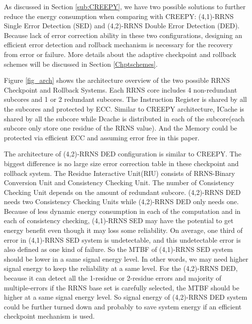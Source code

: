 \documentclass{sig-alternate}
\begin{document}
As discussed in Section \ref{sub:CREEPY}, we have two possible solutions to further reduce the energy consumption when comparing with CREEPY: (4,1)-RRNS Single Error Detection (SED) and (4,2)-RRNS Double Error Detection (DED). Because lack of error correction ability in these two configurations, designing an efficient error detection and rollback mechanism is necessary for the recovery from error or failure. More details about the adaptive checkpoint and rollback schemes will be discussed in Section \ref{Chptschemes}. 

Figure \ref{fig_arch} shows the architecture overview of the two possible RRNS Checkpoint and Rollback Systems. Each RRNS core includes 4 non-redundant subcores and 1 or 2 redundant subcores. The Instruction Register is shared by all the subcores and protected by ECC. Similar to CREEPY architecture, ICache is shared by all the subcore while Dcache is distributed in each of the subcore(each subcore only store one residue of the RRNS value). And the Memory could be protected via efficient ECC and assuming error free in this paper. 

The architecture of (4,2)-RRNS DED configuration is similar to CREEPY. The biggest difference is no large size error correction table in these checkpoint and rollback system. The Residue Interactive Unit(RIU) consists of RRNS-Binary Conversion Unit and Consistency Checking Unit. The number of Consistency Checking Unit depends on the amount of redundant subcore.  (4,2)-RRNS DED needs two Consistency Checking Units while 
 (4,2)-RRNS DED only needs one. Because of less dynamic energy consumption in each of the computation and in each of consistency checking,  (4,1)-RRNS SED may have the potential to get energy benefit even though it may loss some reliability. On average, one third of error in (4,1)-RRNS SED system is undetectable, and this undetectable error is also defined as one kind of failure. So the MTBF of (4,1)-RRNS SED system should be lower in a same signal energy level. In other words, we may need higher signal energy to keep the reliability at a same level. For the (4,2)-RRNS DED, because it can detect all the 1-residue or 2-residue errors and majority of multiple-errors if the RRNS base set is carefully selected, the MTBF should be higher at a same signal energy level. So signal energy of (4,2)-RRNS DED system could be further turned down and probably to save system energy if an efficient checkpoint mechanism is used. 
\end{document}
